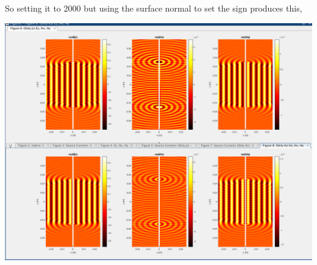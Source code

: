 \documentclass{article}
\newcommand{\0}{\varnothing}
\begin{document}
So setting it to 2000 but using the surface normal to set the sign produces this,

\begin{center}
\includegraphics[width=0.55\columnwidth]{figures/Fields2000Ns}
\end{center}

\newpage
\ \\ 
\\ \\
\end{document}
